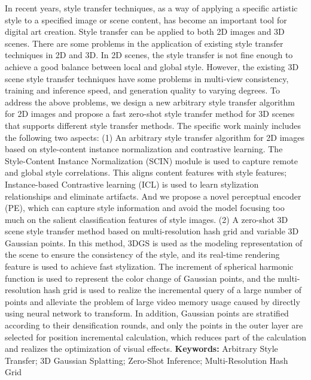 \cleardoublepage
{}
In recent years, style transfer techniques, as a way of applying a specific artistic style to a specified image or scene content, has become an important tool for digital art creation. 
Style transfer can be applied to both 2D images and 3D scenes. There are some problems in the application of existing style transfer techniques in 2D and 3D. 
In 2D scenes, the style transfer is not fine enough to achieve a good balance between local and global style. 
However, the existing 3D scene style transfer techniques have some problems in multi-view consistency, training and inference speed, and generation quality to varying degrees. 
To address the above problems, we design a new arbitrary style transfer algorithm for 2D images and propose a fast zero-shot style transfer method for 3D scenes that supports different style transfer methods. The specific work mainly includes the following two aspects:
\newline \indent(1) An arbitrary style transfer algorithm for 2D images based on style-content instance normalization and contrastive learning. 
The Style-Content Instance Normalization (SCIN) module is used to capture remote and global style correlations. 
This aligns content features with style features; 
Instance-based Contrastive learning (ICL) is used to learn stylization relationships and eliminate artifacts. 
And we propose a novel perceptual encoder (PE), 
which can capture style information and avoid the model focusing too much on the salient classification features of style images.
\newline \indent(2) A zero-shot 3D scene style transfer method based on multi-resolution hash grid and variable 3D Gaussian points. 
In this method, 3DGS is used as the modeling representation of the scene to ensure the consistency of the style, 
and its real-time rendering feature is used to achieve fast stylization. 
The increment of spherical harmonic function is used to represent the color change of Gaussian points, 
and the multi-resolution hash grid is used to realize the incremental query of a large number of points and alleviate the problem of large video memory usage caused by directly using neural network to transform.
In addition, Gaussian points are stratified according to their densification rounds, 
and only the points in the outer layer are selected for position incremental calculation, 
which reduces part of the calculation and realizes the optimization of visual effects.
\newline
{\textbf{Keywords:}} 
Arbitrary Style Transfer; 3D Gaussian Splatting; Zero-Shot Inference; Multi-Resolution Hash Grid
